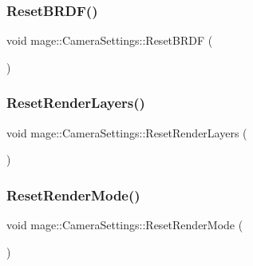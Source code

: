 \subsubsection{\texorpdfstring{Reset\+B\+R\+D\+F()}{ResetBRDF()}}
{\footnotesize\ttfamily void mage\+::\+Camera\+Settings\+::\+Reset\+B\+R\+DF (\begin{DoxyParamCaption}{ }\end{DoxyParamCaption})\hspace{0.3cm}{\ttfamily [noexcept]}}

\hypertarget{classmage_1_1_camera_settings_afc9bcdb1f27adfb1c69a668a24113b46}{}\label{classmage_1_1_camera_settings_afc9bcdb1f27adfb1c69a668a24113b46} 
\subsubsection{\texorpdfstring{Reset\+Render\+Layers()}{ResetRenderLayers()}}
{\footnotesize\ttfamily void mage\+::\+Camera\+Settings\+::\+Reset\+Render\+Layers (\begin{DoxyParamCaption}{ }\end{DoxyParamCaption})\hspace{0.3cm}{\ttfamily [noexcept]}}

\hypertarget{classmage_1_1_camera_settings_aa8facc0ddcd3e3d9f3c05c9f44c77b5d}{}\label{classmage_1_1_camera_settings_aa8facc0ddcd3e3d9f3c05c9f44c77b5d} 
\subsubsection{\texorpdfstring{Reset\+Render\+Mode()}{ResetRenderMode()}}
{\footnotesize\ttfamily void mage\+::\+Camera\+Settings\+::\+Reset\+Render\+Mode (\begin{DoxyParamCaption}{ }\end{DoxyParamCaption})\hspace{0.3cm}{\ttfamily [noexcept]}}

\hypertarget{classmage_1_1_camera_settings_a8fbc3d6013d5f711decaf6f7348f2e15}{}\label{classmage_1_1_camera_settings_a8fbc3d6013d5f711decaf6f7348f2e15} 

